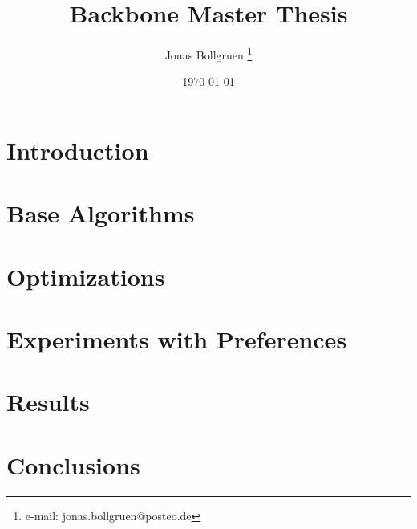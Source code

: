 \documentclass[a4paper,cleardoubleempty,BCOR1cm]{scrbook}
\title{Backbone Master Thesis}
\author{Jonas Bollgruen \thanks{e-mail: jonas.bollgruen@posteo.de}}
\date{\today}
\begin{document}


\chapter{Introduction}




\chapter{Base Algorithms}





\chapter{Optimizations}




\chapter{Experiments with Preferences}


\chapter{Results}
\label{chap:results}



\chapter{Conclusions}

\appendix

%
%
\nocite{*}

\end{document}

